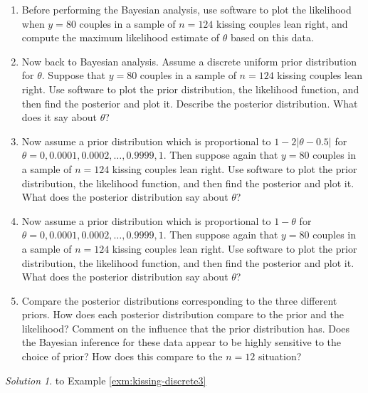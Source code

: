 \documentclass[
]{book}
\providecommand{\tightlist}{%
  \setlength{\itemsep}{0pt}\setlength{\parskip}{0pt}}
\theoremstyle{definition}
\theoremstyle{definition}
\theoremstyle{definition}
\theoremstyle{remark}
\newtheorem*{solution}{Solution}
\begin{document}
\begin{enumerate}
\def\labelenumi{\arabic{enumi}.}
\tightlist
\item
  Before performing the Bayesian analysis, use software to plot the likelihood when \(y=80\) couples in a sample of \(n=124\) kissing couples lean right, and compute the maximum likelihood estimate of \(\theta\) based on this data.
\item
  Now back to Bayesian analysis. Assume a discrete uniform prior distribution for \(\theta\).
  Suppose that \(y=80\) couples in a sample of \(n=124\) kissing couples lean right.
  Use software to plot the prior distribution, the likelihood function, and then find the posterior and plot it. Describe the posterior distribution.
  What does it say about \(\theta\)?
\item
  Now assume a prior distribution which is proportional to \(1-2|\theta-0.5|\) for \(\theta = 0, 0.0001, 0.0002, \ldots, 0.9999, 1\).
  Then suppose again that \(y=80\) couples in a sample of \(n=124\) kissing couples lean right.
  Use software to plot the prior distribution, the likelihood function, and then find the posterior and plot it.
  What does the posterior distribution say about \(\theta\)?
\item
  Now assume a prior distribution which is proportional to \(1-\theta\) for \(\theta = 0, 0.0001, 0.0002, \ldots, 0.9999, 1\).
  Then suppose again that \(y=80\) couples in a sample of \(n=124\) kissing couples lean right.
  Use software to plot the prior distribution, the likelihood function, and then find the posterior and plot it.
  What does the posterior distribution say about \(\theta\)?
\item
  Compare the posterior distributions corresponding to the three different priors. How does each posterior distribution compare to the prior and the likelihood? Comment on the influence that the prior distribution has. Does the Bayesian inference for these data appear to be highly sensitive to the choice of prior? How does this compare to the \(n=12\) situation?
\end{enumerate}

\begin{solution}
{}to Example \ref{exm:kissing-discrete3}
\end{solution}
\end{document}

